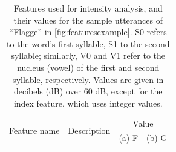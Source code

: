 	
\begin{table}%
		\centering
		\caption[Features used for intensity  analysis]{Features used for intensity analysis, and their values for the sample utterances of ``Flagge'' in \cref{fig:featuresexample}. 
		S0 refers to the word's first syllable, S1 to the second syllable; similarly, V0 and V1 refer to the nucleus (vowel) of the first and second syllable, respectively.
		Values are given in decibels (dB) over 60 dB, except for the index feature, which uses integer values.
		}	
		
		
%		
%	
%	
%	
%		
	\begin{tabularx}{\textwidth}%
		{lXrr}
	\toprule
	\multirow{2}{*}{Feature name} 
					& \multirow{2}{*}{Description}
										& \multicolumn{2}{c}{Value} \\	
				  	&							&  (a) F		& (b) G			\\
	\midrule
	

\end{tabularx}
\end{table}
